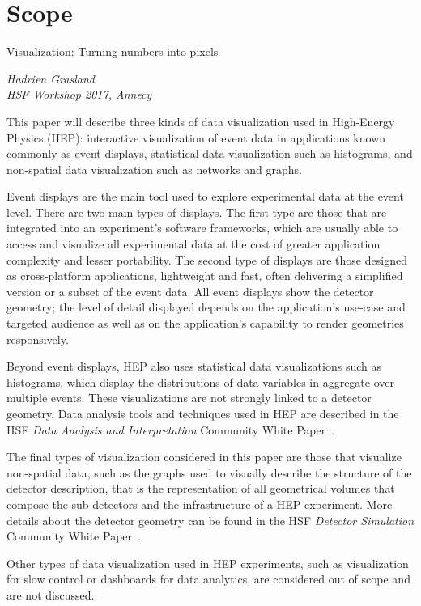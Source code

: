 \documentclass[12pt,a4paper]{article}
\begin{document}
\newpage


\hypertarget{scope}{%
\section{Scope}\label{scope}}

\epigraph{Visualization: Turning numbers into pixels}{\textit{Hadrien Grasland \\ HSF Workshop 2017, Annecy}}

This paper will describe three kinds of data visualization used in High-Energy Physics (HEP): interactive visualization of event data in
applications known commonly as event displays, statistical data visualization such as histograms,
and non-spatial data visualization such as networks and graphs.

Event displays are the main tool used to explore experimental data at the event level.
There are two main types of displays. The first type are those that are integrated into an experiment's software frameworks,
which are usually able to access and visualize all experimental data at the cost of greater application complexity and lesser portability.
The second type of displays are those designed as cross-platform applications, lightweight and fast, often
delivering a simplified version or a subset of the event data. All event displays show the detector geometry; the level of detail
displayed depends on the application's use-case and targeted audience as well as on the application's capability to
render geometries responsively.

Beyond event displays, HEP also uses statistical data visualizations such as histograms, which display the distributions of data variables
in aggregate over multiple events. These visualizations are not strongly linked to a detector geometry. Data
analysis tools and techniques used in HEP are
described in the HSF \textit{Data Analysis and Interpretation} Community White Paper~\cite{HSF-CWP-2017-05}.

The final types of visualization considered in this paper are those that visualize non-spatial data, such as the graphs used to
visually describe the structure of the detector description, that is
the representation of all geometrical volumes that compose the sub-detectors and the infrastructure of a HEP experiment.
More details about the detector geometry can be found in the HSF \textit{Detector Simulation} Community White Paper~\cite{HSF-CWP-2017-07}.

Other types of data visualization used in HEP experiments, such as visualization for slow control
or dashboards for data analytics, are considered out of scope and are not discussed.
\end{document}
